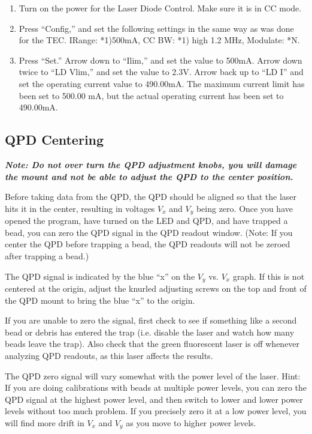 \documentclass{../lab}
\begin{document}
\begin{enumerate}
    \item Turn on the power for the Laser Diode Control. Make sure it is in CC mode.

    \item Press ``Config,'' and set the following settings in the same way as was done for the TEC. IRange: *1)500mA, CC BW: *1) high 1.2 MHz, Modulate: *N.

    \item Press ``Set.'' Arrow down to ``Ilim,'' and set the value to 500mA. Arrow down twice to ``LD Vlim,'' and set the value to 2.3V. Arrow back up to ``LD I'' and set the operating current value to 490.00mA. The maximum current limit has been set to 500.00 mA, but the actual operating current has been set to 490.00mA.
\end{enumerate}

\subsection{QPD Centering}

\emph{\textbf{Note: Do not over turn the QPD adjustment knobs, you will damage the mount and not be able to adjust the QPD to the center position.}}

Before taking data from the QPD, the QPD should be aligned so that the laser hits it in the center, resulting in voltages $V_x$ and $V_y$ being zero. Once you have opened the program, have turned on the LED and QPD, and have trapped a bead, you can zero the QPD signal in the QPD readout window. (Note: If you center the QPD before trapping a bead, the QPD readouts will not be zeroed after trapping a bead.)

The QPD signal is indicated by the blue ``x'' on the $V_y$ vs. $V_x$ graph. If this is not centered at the origin, adjust the knurled adjusting screws on the top and front of the QPD mount to bring the blue ``x'' to the origin.

If you are unable to zero the signal, first check to see if something like a second bead or debris has entered the trap (i.e. disable the laser and watch how many beads leave the trap). Also check that the green fluorescent laser is off whenever analyzing QPD readouts, as this laser affects the results.

The QPD zero signal will vary somewhat with the power level of the laser. Hint: If you are doing calibrations with beads at multiple power levels, you can zero the QPD signal at the highest power level, and then switch to lower and lower power levels without too much problem. If you precisely zero it at a low power level, you will find more drift in $V_x$ and $V_y$ as you move to higher power levels.
\end{document}
